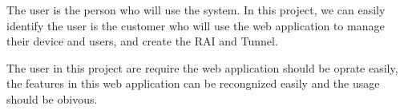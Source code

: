 The user is the person who will use the system. 
In this project, we can easily identify the user is the customer who will use the web application to manage their device and users,
and create the RAI and Tunnel.

The user in this project are require the web application should be oprate easily, 
the features in this web application can be recongnized easily and the usage should be obivous.
